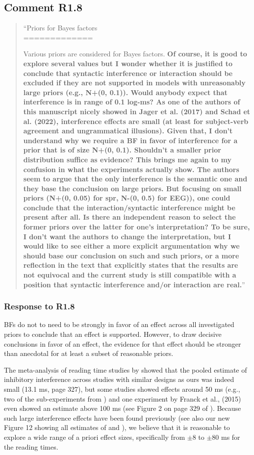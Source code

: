 \documentclass[12pt]{article}
\begin{document}
\subsection*{Comment R1.8}
\begin{quote}
``Priors for Bayes factors\\
=============

Various priors are considered for Bayes factors. \textbf{Of course, it is good to explore several values but I wonder whether it is justified to conclude that syntactic interference or interaction should be excluded if they are not supported in models with unreasonably large priors (e.g., N+(0, 0.1)). Would anybody expect that interference is in range of 0.1 log-ms? As one of the authors of this manuscript nicely showed in Jager et al. (2017) and Schad et al. (2022), interference effects are small (at least for subject-verb agreement and ungrammatical illusions). Given that, I don't understand why we require a BF in favor of interference for a prior that is of size N+(0, 0.1). Shouldn't a smaller prior distribution suffice as evidence? This brings me again to my confusion in what the experiments actually show. The authors seem to argue that the only interference is the semantic one and they base the conclusion on large priors. But focusing on small priors (N+(0, 0.05) for spr, N-(0, 0.5) for EEG)), one could conclude that the interaction/syntactic interference might be present after all. Is there an independent reason to select the former priors over the latter for one's interpretation? To be sure, I don't want the authors to change the interpretation, but I would like to see either a more explicit argumentation why we should base our conclusion on such and such priors, or a more reflection in the text that explicitly states that the results are not equivocal and the current study is still compatible with a position that syntactic interference and/or interaction are real.}''\end{quote}

\subsubsection*{Response to R1.8}
BFs do not to need to be strongly in favor of an effect across all investigated priors to conclude that an effect is supported. However, to draw decisive conclusions in favor of an effect, the evidence for that effect should be stronger than anecdotal for at least a subset of reasonable priors.

The meta-analysis of reading time studies by \textcite{jaeger_etal_2017} showed that the pooled estimate of inhibitory interference across studies with similar designs as ours was indeed small (13.1 ms, page 327), but some studies showed effects around 50 ms (e.g., two of the sub-experiments from \cite{vandyke07}) and one experiment by Franck et al., (2015) even showed an estimate above 100 ms (see Figure 2 on page 329 of \cite{jaeger_etal_2017}). Because such large interference effects have been found previously (see also our new Figure 12 showing all estimates of \cite{vandyke07} and \cite{mertzen}), we believe that it is reasonable to explore a wide range of a priori effect sizes, specifically from $\pm$8 to $\pm$80 ms for the reading times. 
\end{document}
